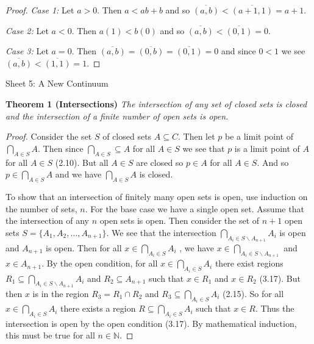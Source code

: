 \documentclass{article}
\begin{document}
\begin{flushleft}
\begin{proof}
\textsl{Case 1:} Let $a>0$. Then $a<ab+b$ and so $\overline{(a,b)} < \overline{(a+1,1)} = a+1$.\newline

\textsl{Case 2:} Let $a<0$. Then $a(1)<b(0)$ and so $\overline{(a,b)} < \overline{(0,1)} = 0$.\newline

\textsl{Case 3:} Let $a=0$. Then $\overline{(a,b)}=\overline{(0,b)}=\overline{(0,1)}=0$ and since $0<1$ we see $\overline{(a,b)} < \overline{(1,1)} = 1$.
\end{proof}
\newpage

\Large

Sheet 5: A New Continuum\newline

\normalsize

\textbf{Theorem 1 (Intersections)}
\textsl{The intersection of any set of closed sets is closed and the intersection of a finite number of open sets is open.}
\begin{proof}
Consider the set $S$ of closed sets $A \subseteq C$. Then let $p$ be a limit point of $\bigcap_{A \in S} A$. Then since $\bigcap_{A \in S} \subseteq A$ for all $A \in S$ we see that $p$ is a limit point of $A$ for all $A \in S$ (2.10). But all $A \in S$ are closed so $p \in A$ for all $A \in S$. And so $p \in \bigcap_{A \in S} A$ and we have $\bigcap_{A \in S} A$ is closed.\newline

To show that an intersection of finitely many open sets is open, use induction on the number of sets, $n$. For the base case we have a single open set. Assume that the intersection of any $n$ open sets is open. Then consider the set of $n+1$ open sets $S = \{A_1,A_2, \dots ,A_{n+1}\}$. We see that the intersection $\bigcap_{A_i \in S\backslash A_{n+1}} A_i$ is open and $A_{n+1}$ is open. Then for all $x \in \bigcap_{A_i \in S} A_i$ , we have $x \in \bigcap_{A_i \in S \backslash A_{n+1}}$ and $x \in A_{n+1}$. By the open condition, for all $x \in \bigcap_{A_i \in S} A_i$ there exist regions $R_1 \subseteq \bigcap_{A_i \in S \backslash A_{n+1}} A_i$ and $R_2 \subseteq A_{n+1}$ such that $x \in R_1$ and $x \in R_2$ (3.17). But then $x$ is in the region $R_3=R_1 \cap R_2$ and $R_3 \subseteq \bigcap_{A_i \in S} A_i$ (2.15). So for all $x \in \bigcap_{A_i \in S} A_i$  there exists a region $R \subseteq \bigcap_{A_i \in S} A_i$ such that $x \in R$. Thus the intersection is open by the open condition (3.17). By mathematical induction, this must be true for all $n \in \mathbb{N}$.
\end{proof}


\end{flushleft}
\end{document}
